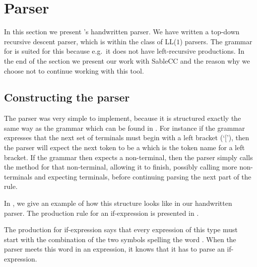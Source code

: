 \section{Parser}
\label{sec:parserimplementation}

In this section we present \productname{}'s handwritten parser. We have
written a top-down recursive descent parser, which is within the class
of LL($1$) parsers. The grammar for \productname{} is suited for this
because e.g.\ it does not have left-recursive productions. In the end of
the section we present our work with SableCC and the reason why we choose
not to continue working with this tool.

\subsection{Constructing the parser}
The parser was very simple to implement, because it is structured exactly the same way as the
grammar which can be found in .  For instance if the grammar
expresses that the next set of terminals must begin with a left bracket (`['),
  then the parser will expect the next token to be a  which
  is the token name for a left bracket. If the grammar then expects a
  non-terminal, then the parser simply calls the method for that non-terminal,
  allowing it to finish, possibly calling more non-terminals and expecting
  terminals, before continuing parsing the next part of the rule.

In , we give an example of how this structure looks like in
our handwritten parser. The production rule for an if-expression is presented in
.


The production for if-expression says that every expression of this type
must start with the combination of the two symbols spelling the word
. When the parser meets this word in an expression, it knows
that it has to parse an if-expression.



